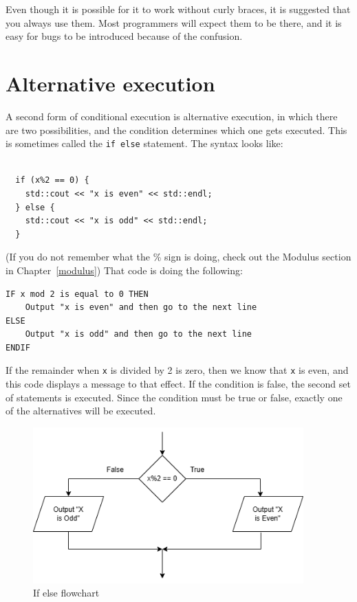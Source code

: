 Even though it is possible for it to work without curly braces, it is suggested that you
always use them. Most programmers will expect them to be there, and it is easy for bugs to be introduced because of the confusion.

\section {Alternative execution}
\label{alternative}

A second form of conditional execution is alternative execution,
in which there are two possibilities, and the condition determines
which one gets executed.  This is sometimes called the {\tt if else} statement. The syntax looks like:

\begin{lstlisting}
    
  if (x%2 == 0) {
    std::cout << "x is even" << std::endl;
  } else {
    std::cout << "x is odd" << std::endl;
  }
\end{lstlisting}
%
(If you do not remember what the \% sign is doing, check out the
Modulus section in Chapter~\ref{modulus})
That code is doing the following:
\begin{verbatim}
IF x mod 2 is equal to 0 THEN
    Output "x is even" and then go to the next line
ELSE
    Output "x is odd" and then go to the next line
ENDIF
\end{verbatim}
If the remainder when {\tt x} is divided by 2 is zero, then
we know that {\tt x} is even, and this code displays a message
to that effect.  If the condition is false, the second
set of statements is executed.  Since the condition must
be true or false, exactly one of the alternatives will be
executed.

\begin{figure}[h]
    \centering
    \includegraphics[height=6cm]{images/ifelseflow.png}
    \caption{If else flowchart}
    \label{fig:ifelseflow}
\end{figure}


